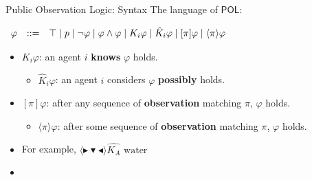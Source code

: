 \documentclass[usenames,dvipsnames]{beamer}
\newcommand\ldiaarg[1]{\langle#1\rangle}
\newcommand{\POL}{\mathsf{POL}}
\newcommand{\ep}{\ensuremath{\varepsilon}}
\newcommand{\obsright}{\blacktriangleright}
\newcommand{\obsleft}{\blacktriangleleft}
\newcommand{\obsdown}{\blacktriangledown}
\renewcommand{\phi}{\varphi}
\begin{document}
\begin{frame}{Public Observation Logic: Syntax\footnotemark[1]}
The language of $\POL$:
\vspace{.1cm}
			
		     $\begin{array}{r@{\quad::= \quad}l}
				\phi  &
				\top
				\mid
				p
				\mid \neg \phi
				\mid \phi \land \phi
				\mid K_i\phi
				\mid \hat{K}_i \phi
				\mid [\pi] \phi
				\mid \ldiaarg{\pi} \phi
			\end{array}$
			
			\vspace{.1cm}
    \begin{itemize}
        \item $K_i\varphi$: an agent $i$ \textbf{knows} $\varphi$ holds.
        \vspace{.1cm}
        \begin{itemize}
            \item $\hat{K}_i\phi$: an agent $i$ considers $\varphi$ \textbf{possibly} holds.
        \end{itemize}
        \vspace{.1cm}
        \item $[\pi]\varphi$: after any sequence of \textbf{observation} matching $\pi$, $\varphi$ holds.
        \vspace{.1cm}
        \begin{itemize}
            \item $\ldiaarg{\pi}\phi$: after some sequence of \textbf{observation} matching $\pi$, $\varphi$ holds.
        \end{itemize}
        \vspace{.1cm}
        \item For example, \st{$\ldiaarg{\obsright\obsdown\obsleft}\hat{K_A} \textrm{ water }$}
    
    \item[]
    

\end{itemize}
\end{frame}
\end{document}
